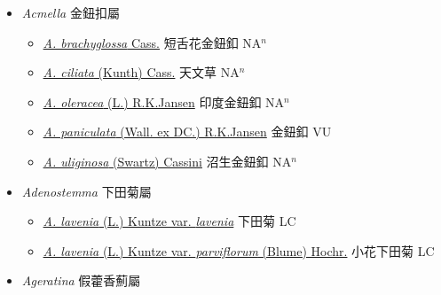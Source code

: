 
  \begin{itemize}
 \item[] \textit{Acmella} 金鈕扣屬
                    
  \begin{itemize}
        \item[] \href{http://www.theplantlist.org/tpl1.1/search?q=Acmella+brachyglossa}{\textit{A. brachyglossa} Cass.}   短舌花金鈕釦 NA$^n$
        \item[] \href{http://www.theplantlist.org/tpl1.1/search?q=Acmella+ciliata}{\textit{A. ciliata} (Kunth) Cass.}   天文草 NA$^n$
        \item[] \href{http://www.theplantlist.org/tpl1.1/search?q=Acmella+oleracea}{\textit{A. oleracea} (L.) R.K.Jansen}   印度金鈕釦 NA$^n$
        \item[] \href{http://www.theplantlist.org/tpl1.1/search?q=Acmella+paniculata}{\textit{A. paniculata} (Wall. ex DC.) R.K.Jansen}   金鈕釦 VU
        \item[] \href{http://www.theplantlist.org/tpl1.1/search?q=Acmella+uliginosa}{\textit{A. uliginosa} (Swartz) Cassini}   沼生金鈕釦 NA$^n$
  \end{itemize}
 \item[] \textit{Adenostemma} 下田菊屬
                    
  \begin{itemize}
        \item[] \href{http://www.theplantlist.org/tpl1.1/search?q=Adenostemma+lavenia+var.+lavenia}{\textit{A. lavenia} (L.) Kuntze var. \textit{lavenia}}   下田菊 LC
        \item[] \href{http://www.theplantlist.org/tpl1.1/search?q=Adenostemma+lavenia+var.+parviflorum}{\textit{A. lavenia} (L.) Kuntze var. \textit{parviflorum} (Blume) Hochr.}   小花下田菊 LC
  \end{itemize}
 \item[] \textit{Ageratina} 假藿香薊屬
                    

\end{itemize}
